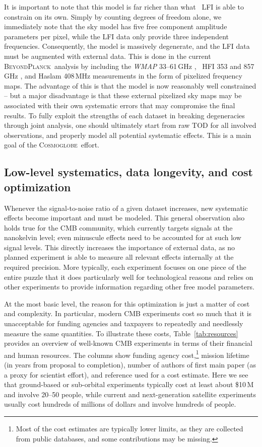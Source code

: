 \documentclass[twocolumn]{aa}
\newcommand{\BP}{\textsc{BeyondPlanck}}
\newcommand{\cosmoglobe}{\textsc{Cosmoglobe}}
\begin{document}
It is important to note that this model is far richer than what \Planck\ LFI is able to constrain on its own. Simply by counting degrees of freedom alone, we immediately note that the sky model has five free component amplitude parameters per pixel, while the LFI data only provide three independent frequencies. Consequently, the model is massively degenerate, and the LFI data must be augmented with external data. This is done in the current \BP\ analysis by including the \textit{WMAP} 33--61\,GHz \citep{bennett2012}, \Planck\ HFI 353 and 857\,GHz \citep{planck2016-l03}, and Haslam 408\,MHz \citep{haslam1982} measurements in the form of pixelized frequency maps. The advantage of this is that the model is now reasonably well constrained -- but a major disadvantage is that these external pixelized sky maps may be associated with their own systematic errors that may compromise the final results. To fully exploit the strengths of each dataset in breaking degeneracies through joint analysis, one should ultimately start from raw TOD for all involved observations, and properly model all potential systematic effects. This is a main goal of the \cosmoglobe\ effort.

\subsection{Low-level systematics, data longevity,
  and cost optimization}

Whenever the signal-to-noise ratio of a given dataset increases, new systematic effects become important and must be modeled. This general observation also holds true for the CMB community, which currently targets signals at the nanokelvin level; even minuscule effects need to be accounted for at such low signal levels. This directly increases the importance of external data, as no planned experiment is able to measure all relevant effects internally at the required precision. More typically, each experiment focuses on one piece of the entire puzzle that it does particularly well for technological reasons and relies on other experiments to provide information regarding other free model parameters.

At the most basic level, the reason for this optimization is just a matter of cost and complexity. In particular, modern CMB experiments cost so much that it is unacceptable for funding agencies and taxpayers to repeatedly and needlessly measure the same quantities. To illustrate these costs, Table~\ref{tab:resources} provides an overview of well-known CMB experiments in terms of their financial and human resources. The columns show funding agency cost,\footnote{Most of the cost estimates are typically lower limits, as they are collected from public databases, and some contributions may be missing.} mission lifetime (in years from proposal to completion), number of authors of first main paper (as a proxy for scientist effort), and reference used for a cost estimate. Here we see that ground-based or sub-orbital experiments typically cost at least about \$10\,M and involve 20--50 people, while current and next-generation satellite experiments usually cost hundreds of millions of dollars and involve hundreds of people.
\end{document}
